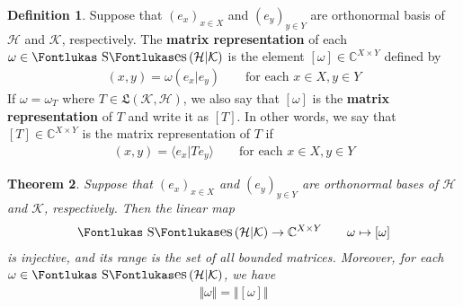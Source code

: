 \documentclass[12pt,b5paper,notitlepage]{article}
\theoremstyle{definition}
\newtheorem{df}{Definition}[subsection]
\theoremstyle{plain}
\newtheorem{thm}[df]{Theorem}
\DeclareMathOperator{\Ses}{\text{\Fontlukas S}\text{\kern -0pt {\Fontlukas\large es}}\,}
\newcommand{\fk}{\mathfrak}
\newcommand{\bk}[1]{\langle {#1}\rangle}
\newcommand{\Cbb}{\mathbb C}
\newcommand{\MH}{\mathcal H}
\newcommand{\MK}{\mathcal K}
\numberwithin{equation}{section}
\begin{document}
\begin{df}\label{lb280}
Suppose that $(e_x)_{x\in X}$ and $(e_y)_{y\in Y}$ are orthonormal basis of $\MH$ and $\MK$, respectively. The \textbf{matrix representation}  of each $\omega\in\Ses(\MH|\MK)$ is the element $[\omega]\in\Cbb^{X\times Y}$ defined by
\begin{align*}
[\omega](x,y)=\omega(e_x|e_y)\qquad\text{for each }x\in X,y\in Y
\end{align*}  
If $\omega=\omega_T$ where $T\in\fk L(\MK,\MH)$, we also say that $[\omega]$ is the \textbf{matrix representation} of $T$ and write it as $[T]$. In other words, we say that $[T]\in\Cbb^{X\times Y}$ is the matrix representation of $T$ if
\begin{align*}
[T](x,y)=\bk{e_x|Te_y}\qquad\text{for each }x\in X,y\in Y
\end{align*}
\end{df}



\begin{thm}\label{lb142}
Suppose that $(e_x)_{x\in X}$ and $(e_y)_{y\in Y}$ are orthonormal bases of $\MH$ and $\MK$, respectively. Then the linear map
\begin{gather}\label{eq70}
\Ses(\MH|\MK)\rightarrow\Cbb^{X\times Y}\qquad \omega\mapsto[\omega]
\end{gather}
is injective, and its range is the set of all bounded matrices. Moreover, for each $\omega\in\Ses(\MH|\MK)$, we have
\begin{align*}
\big\Vert\omega\big\Vert=\big\Vert[\omega]\big\Vert
\end{align*}
\end{thm}
\end{document}

